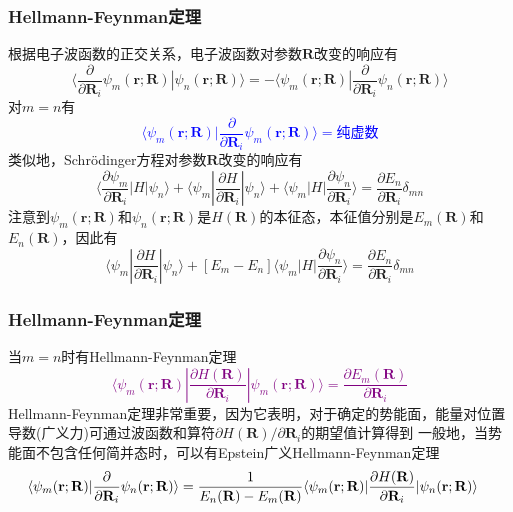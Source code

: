 \frame
{
	\frametitle{\textrm{Hellmann-Feynman}定理}
	根据电子波函数的正交关系，电子波函数对参数$\mathbf{R}$改变的响应有
	\begin{displaymath}
		\langle\dfrac{\partial}{\partial{\mathbf{R}_i}}\psi_m(\mathbf{r};\mathbf{R})|\psi_n(\mathbf{r};\mathbf{R})\rangle=-\langle\psi_m(\mathbf{r};\mathbf{R})|\dfrac{\partial}{\partial{\mathbf{R}_i}}\psi_n(\mathbf{r};\mathbf{R})\rangle
	\end{displaymath}
	对$m=n$有
	\textcolor{blue}{
		\begin{displaymath}
			\langle\psi_m(\mathbf{r};\mathbf{R})|\dfrac{\partial}{\partial{\mathbf{R}_i}}\psi_m(\mathbf{r};\mathbf{R})\rangle=\mbox{纯虚数}
		\end{displaymath} }
		类似地，\textrm{Schr\"odinger}方程对参数$\mathbf{R}$改变的响应有
		\begin{displaymath}
			\langle\dfrac{\partial\psi_m}{\partial{\mathbf{R}_i}}|H|\psi_n\rangle+\langle\psi_m|\dfrac{\partial H}{\partial{\mathbf{R}_i}}|\psi_n\rangle+\langle\psi_m|H|\dfrac{\partial\psi_n}{\partial{\mathbf{R}_i}}\rangle=\dfrac{\partial E_n}{\partial\mathbf{R}_i}\delta_{mn}
		\end{displaymath}
		注意到$\psi_m(\mathbf{r};\mathbf{R})$和$\psi_n(\mathbf{r};\mathbf{R})$是$H(\mathbf{R})$的本征态，本征值分别是$E_m(\mathbf{R})$和$E_n(\mathbf{R})$，因此有
		\begin{displaymath}
			\langle\psi_m|\dfrac{\partial H}{\partial{\mathbf{R}_i}}|\psi_n\rangle+[E_m-E_n]\langle\psi_m|H|\dfrac{\partial\psi_n}{\partial{\mathbf{R}_i}}\rangle=\dfrac{\partial E_n}{\partial\mathbf{R}_i}\delta_{mn}
		\end{displaymath}
}

\frame
{
	\frametitle{\textrm{Hellmann-Feynman}定理}
	当$m=n$时有\textrm{Hellmann-Feynman}定理
	\textcolor{purple}{
	\begin{displaymath}
		\langle\psi_m(\mathbf{r};\mathbf{R})|\dfrac{\partial H(\mathbf{R})}{\partial{\mathbf{R}_i}}|\psi_m(\mathbf{r};\mathbf{R})\rangle=\dfrac{\partial E_m(\mathbf{R})}{\partial\mathbf{R}_i}
	\end{displaymath}}
	\textrm{Hellmann-Feynman}定理非常重要，因为它表明，对于确定的势能面，能量对位置导数(广义力)可通过波函数和算符$\partial H(\mathbf{R})/\partial\mathbf{R}_i$的期望值计算得到
	\vskip 5pt
	一般地，当势能面不包含任何简并态时，可以有\textrm{Epstein}广义\textrm{Hellmann-Feynman}定理
	\begin{displaymath}
		\hspace*{-10pt}
		\langle\psi_m(\mathbf{r};\mathbf{R})|\dfrac{\partial}{\partial{\mathbf{R}_i}}\psi_n(\mathbf{r};\mathbf{R})\rangle=\dfrac1{E_n(\mathbf{R})-E_m(\mathbf{R})}\langle\psi_m(\mathbf{r};\mathbf{R})|\dfrac{\partial H(\mathbf{R})}{\partial{\mathbf{R}_i}}|\psi_n(\mathbf{r};\mathbf{R})\rangle
	\end{displaymath}
}

